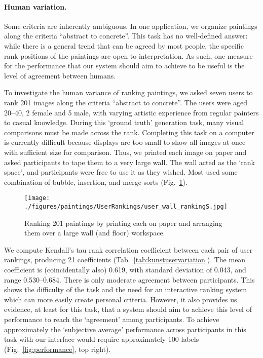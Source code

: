\documentclass{article}
\begin{document}
\paragraph{Human variation.}
Some criteria are inherently ambiguous. In one application, we organize paintings along the criteria ``abstract to concrete''. This task has no well-defined answer: while there is a general trend that can be agreed by most people, the specific rank positions of the paintings are open to interpretation. As such, one measure for the performance that our system should aim to achieve to be useful is the level of agreement between humans.

To investigate the human variance of ranking paintings, we asked seven users to rank 201 images along the criteria ``abstract to concrete''. The users were aged 20--40, 2 female and 5 male, with varying artistic experience from regular painters to casual knowledge. During this `ground truth' generation task, many visual comparisons must be made across the rank. Completing this task on a computer is currently difficult because displays are too small to show all images at once with sufficient size for comparison. Thus, we printed each image on paper and asked participants to tape them to a very large wall. The wall acted as the `rank space', and participants were free to use it as they wished. Most used some combination of bubble, insertion, and merge sorts (Fig.~\ref{fig:paintingwallranking}).

\begin{figure}[t]
    \centering
    \fcapside[\FBwidth]
		{\texttt{[image: ./figures/paintings/UserRankings/user\_wall\_rankingS.jpg]}}
    {\caption{Ranking 201 paintings by printing each on paper and arranging them over a large wall (and floor) workspace.}\label{fig:paintingwallranking}}
\end{figure}

We compute Kendall's tau rank correlation coefficient between each pair of user rankings, producing 21 coefficients (Tab.~\ref{tab:kunstuservariation}). The mean coefficient is (coincidentally also) 0.619, with standard deviation of 0.043, and range 0.530--0.684. There is only moderate agreement between participants. This shows the difficulty of the task and the need for an interactive ranking system which can more easily create personal criteria. However, it also provides us evidence, at least for this task, that a system should aim to achieve this level of performance to reach the `agreement' among participants. To achieve approximately the `subjective average' performance across participants in this task with our interface would require approximately 100 labels (Fig.~\ref{fig:performance}, top right). 
\end{document}
